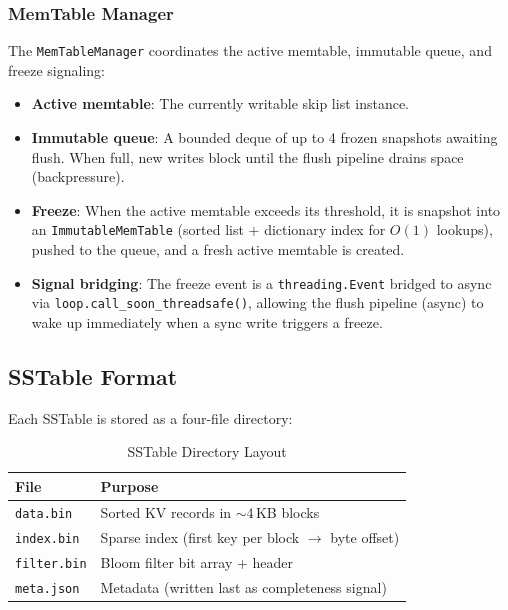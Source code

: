 \documentclass[conference]{IEEEtran}
\begin{document}
\subsubsection{MemTable Manager}

The \texttt{MemTableManager} coordinates the active memtable, immutable queue, and freeze signaling:

\begin{itemize}[leftmargin=*]
    \item \textbf{Active memtable}: The currently writable skip list instance.
    \item \textbf{Immutable queue}: A bounded deque of up to 4 frozen snapshots awaiting flush. When full, new writes block until the flush pipeline drains space (backpressure).
    \item \textbf{Freeze}: When the active memtable exceeds its threshold, it is snapshot into an \texttt{ImmutableMemTable} (sorted list + dictionary index for $O(1)$ lookups), pushed to the queue, and a fresh active memtable is created.
    \item \textbf{Signal bridging}: The freeze event is a \texttt{threading.Event} bridged to async via \texttt{loop.call\_soon\_threadsafe()}, allowing the flush pipeline (async) to wake up immediately when a sync write triggers a freeze.
\end{itemize}

\subsection{SSTable Format}

Each SSTable is stored as a four-file directory:

\begin{table}[H]
\centering
\caption{SSTable Directory Layout}
\label{tab:sstable}
\begin{tabular}{@{}ll@{}}
\toprule
\textbf{File} & \textbf{Purpose} \\
\midrule
\texttt{data.bin} & Sorted KV records in $\sim$4\,KB blocks \\
\texttt{index.bin} & Sparse index (first key per block $\rightarrow$ byte offset) \\
\texttt{filter.bin} & Bloom filter bit array + header \\
\texttt{meta.json} & Metadata (written last as completeness signal) \\
\bottomrule
\end{tabular}
\end{table}
\end{document}
